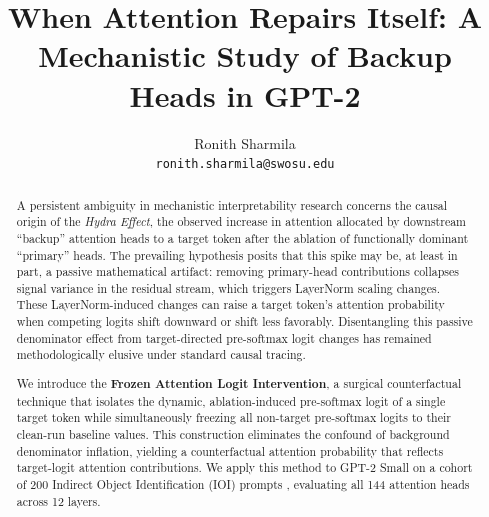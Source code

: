 \documentclass[12pt,a4paper]{article}
\title{%
  \textbf{When Attention Repairs Itself: A Mechanistic Study of Backup Heads in GPT-2}\\
}
\author{
 Ronith Sharmila\\
  \texttt{ronith.sharmila@swosu.edu}
}
\date{} %
\begin{document}
\maketitle
\begin{abstract}

A persistent ambiguity in mechanistic interpretability research concerns the
causal origin of the \emph{Hydra Effect}, the observed increase in attention
allocated by downstream ``backup'' attention heads to a target token after the
ablation of functionally dominant ``primary'' heads. The prevailing hypothesis
posits that this spike may be, at least in part, a passive mathematical artifact:
removing primary-head contributions collapses signal variance in the residual stream,
which triggers LayerNorm scaling changes. These LayerNorm-induced changes can raise
a target token’s attention probability when competing logits shift downward or
shift less favorably. Disentangling this passive denominator effect from target-directed pre-softmax logit
changes has remained methodologically elusive under standard causal tracing.

We introduce the \textbf{Frozen Attention Logit Intervention}, a surgical
counterfactual technique that isolates the dynamic, ablation-induced pre-softmax
logit of a single target token while simultaneously freezing all non-target
pre-softmax logits to their clean-run baseline values. This construction
eliminates the confound of background denominator inflation, yielding a
counterfactual attention probability that reflects target-logit attention contributions.
We apply this method to GPT-2 Small \citep{radford2019language} on a cohort of
200 Indirect Object Identification (IOI) prompts \citep{wang2022interpretability},
evaluating all 144 attention heads across 12 layers.


\end{abstract}
\end{document}
